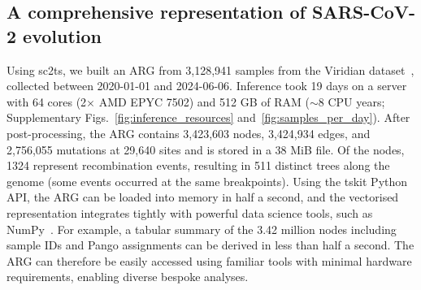\documentclass[12pt]{article}
\makeatletter
\newcommand{\refprefix}[1]{#1~}
\newcommand{\numref}[1]{{\let\refprefix\@gobble\ref{#1}}}
\makeatother
\begin{document}
\subsection*{A comprehensive representation of SARS-CoV-2 evolution}

Using sc2ts, we built an ARG from 3,128,941 samples
from the Viridian dataset~\cite{Hunt2026},
collected between 2020-01-01 and 2024-06-06.
Inference took 19 days on a server with
64 cores (2$\times$ AMD EPYC 7502) and 512 GB of RAM
($\sim$8 CPU years;
Supplementary Figs.~\numref{fig:inference_resources} and~\numref{fig:samples_per_day}).
After post-processing, the ARG contains
3,423,603 nodes,  %
3,424,934 edges, and
2,756,055 mutations
at 29,640 sites
and is stored in a 38 MiB file.
Of the nodes, 1324 represent recombination events,
resulting in 511 distinct trees along the genome
(some events occurred at the same breakpoints).
Using the tskit Python API,
the ARG can be loaded into memory in half a second,
and the vectorised representation integrates tightly
with powerful data science tools, such as NumPy~\cite{Harris2020array}.
For example, a tabular summary of the 3.42 million nodes
including sample IDs and Pango assignments
can be derived in less than half a second.
The ARG can therefore be easily accessed using familiar tools
with minimal hardware requirements, enabling diverse bespoke analyses.

\end{document}
